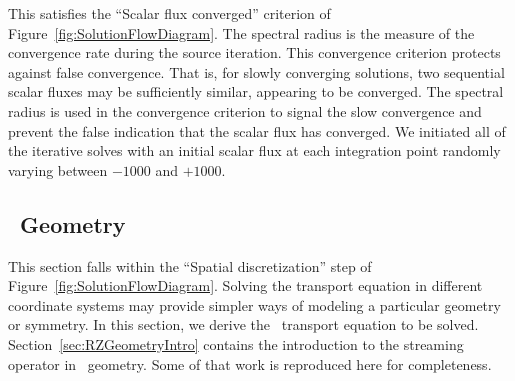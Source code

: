 \documentclass[12pt]{article}
\begin{document}
\noindent This satisfies the ``Scalar flux converged'' criterion of Figure~\ref{fig:SolutionFlowDiagram}. The spectral radius is the measure of the convergence rate during the source iteration. This convergence criterion protects against false convergence. That is, for slowly converging solutions, two sequential scalar fluxes may be sufficiently similar, appearing to be converged. The spectral radius is used in the convergence criterion to signal the slow convergence and prevent the false indication that the scalar flux has converged. We initiated all of the iterative solves with an initial scalar flux at each integration point randomly varying between $-1000$ and $+1000$.

\subsection{\RZ\ Geometry}
\label{sec:MethodsRZ}
This section falls within the ``Spatial discretization'' step of Figure~\ref{fig:SolutionFlowDiagram}. Solving the transport equation in different coordinate systems may provide simpler ways of modeling a particular geometry or symmetry. In this section, we derive the \RZ\ transport equation to be solved. Section~\ref{sec:RZGeometryIntro} contains the introduction to the streaming operator in \RZ\ geometry. Some of that work is reproduced here for completeness.
\end{document}
